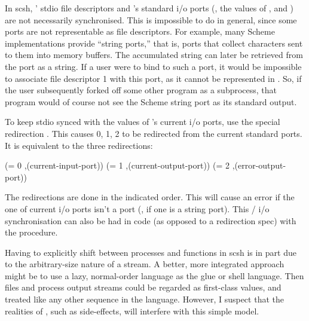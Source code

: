 \begin{sloppypar}
In scsh, {\Unix}' stdio file descriptors and {\Scheme}'s standard i/o ports
(\ie, the values of ,  and
) are not necessarily synchronised. 
This is impossible to do in general, since some {\Scheme} ports are 
not representable as {\Unix} file descriptors.
For example, many Scheme implementations provide ``string ports,'' 
that is, ports that collect characters sent to them into memory buffers.
The accumulated string can later be retrieved from the port as a string.
If a user were to bind  to such a port, it would
be impossible to associate file descriptor 1 with this port, as it
cannot be represented in {\Unix}.
So, if the user subsequently forked off some other program as a subprocess,
that program would of course not see the Scheme string port as its standard
output.
\end{sloppypar}

To keep stdio synced with the values of {\Scheme}'s current i/o ports,
use the special redirection .
This causes 0, 1, 2 to be redirected from the current {\Scheme} standard ports.
It is equivalent to the three redirections:
\begin{code}
(= 0 ,(current-input-port))
(= 1 ,(current-output-port))
(= 2 ,(error-output-port))\end{code}
%
The redirections are done in the indicated order.  This will cause an error if
the one of current i/o ports isn't a {\Unix} port (\eg, if one is a string
port).
This {\Scheme}/{\Unix} i/o synchronisation can also be had in {\Scheme} code 
(as opposed to a redirection spec) with the 
procedure.

Having to explicitly shift between processes and functions in scsh is in part
due to the arbitrary-size nature of a {\Unix} stream.
A better, more integrated approach might be to use a lazy, normal-order
language as the glue or shell language.
Then files and process output streams could be regarded as first-class values,
and treated like any other sequence in the language.
However, I suspect that the realities of {\Unix}, such as side-effects, will
interfere with this simple model.

